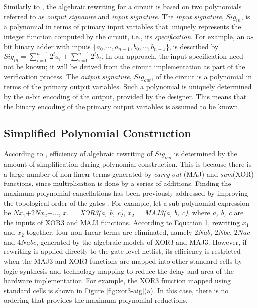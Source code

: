 Similarly to \cite{ciesielski2015verification}, the algebraic rewriting for a circuit is based on two polynomials referred to as {\it output signature} and {\it input signature}.
The \emph{input signature}, $Sig_{in}$, is a polynomial in terms of primary input variables that uniquely represents the integer function computed by the circuit, i.e., its {\it specification}. For example, an $n$-bit binary adder with inputs \{$a_0,\cdots,a_{n-1},b_0,\cdots,b_{n-1}$\}, is described by $Sig_{in} = \sum _{i=0} ^{n-1} 2^i a_i + \sum _{i=0} ^{n-1} 2^i b_i$. 
In our approach, the input specification need not be known; it will be derived from the circuit implementation as part of the verification process. The \emph{output signature}, $Sig_{out}$, of the circuit is a polynomial in terms of the primary output variables. Such a polynomial is uniquely determined by the $n$-bit encoding of the output, provided by the designer. This means that the binary encoding of the primary output variables is assumed to be known. 

\subsection{Simplified Polynomial Construction}

According to \cite{yu:2016-tcad-verification}, efficiency of algebraic rewriting of $Sig_{out}$ is determined by the amount of simplification during polynomial construction. This is because there is a large number of non-linear terms generated by \textit{carry-out} (MAJ) and \textit{sum}(XOR) functions, since multiplication is done by a series of additions. Finding the maximum polynomial cancellations has been previously addressed by improving the topological order of the gates \cite{yu:2016-tcad-verification}. For example, let a sub-polynomial expression be $N$$x_1$+$2N$$x_2$+..., $x_1$ = \textit{XOR3(a, b, c)}, $x_2$ = \textit{MAJ3(a, b, c)}, where \textit{a, b, c} are the inputs of XOR3 and MAJ3 functions. According to Equation 1, rewriting $x_1$ and $x_2$ together, four non-linear terms are eliminated, namely $2N$$ab$, $2N$$bc$, $2N$$ac$ and $4N$$abc$, generated by the algebraic models of XOR3 and MAJ3. However, if rewriting is applied directly to the gate-level netlist, its efficiency is restricted when the MAJ3 and XOR3 functions are mapped into other standard cells by logic synthesis and technology mapping to reduce the delay and area of the hardware implementation. For example, the XOR3 function mapped using standard cells is shown in Figure \ref{fig:xor3-aig}(a). In this case, there is no ordering that provides the maximum polynomial reductions. 




